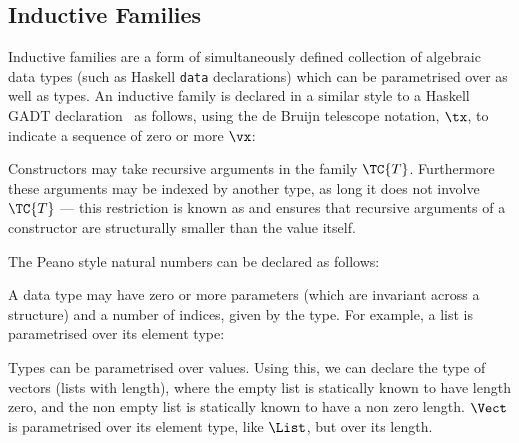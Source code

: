 \subsection{Inductive Families}

\label{indfamilies}

Inductive families \cite{dybjer94} are a form of simultaneously
defined collection of algebraic data types (such as Haskell
\texttt{data} declarations) which can be parametrised over
 as well as types.  An inductive family is declared 
in a similar style to a Haskell GADT declaration~\cite{gadts}
as
follows, using the de Bruijn telescope notation, $\tx$, to indicate a
sequence of zero or more $\vx$:


Constructors may take recursive arguments in the family
$\TC{T}$. Furthermore these arguments may be indexed by another type,
as long it does not involve $\TC{T}$ --- this restriction is known as
 and ensures that recursive arguments of a
constructor are structurally smaller than the value itself.

The Peano style natural numbers can be declared as follows:

\DM{
\Data\:\Nat\Hab\Type\hg\Where\hg\Z\Hab\Nat\:\mid\:\suc\Hab\fbind{\vk}{\Nat}{\Nat}
}

A data type may have zero or more parameters (which are invariant
across a structure) and a number of indices, given by the type. For
example, a list is parametrised over its element type:

\DM{
\AR{
\Data\:\List\:(\vA\Hab\Type)\Hab\Type\hg\Where
\ARd{
& \nil\Hab\List\:\vA\\
\mid & \cons\Hab\fbind{\vx}{\vA}{\fbind{\vxs}{\List\:\vA}{\List\:\vA}}
}
}
}

Types can be
parametrised over values. Using this, we can declare the type of
vectors (lists with length), where the empty list is statically known
to have length zero, and the non empty list is statically known to
have a non zero length. $\Vect$ is parametrised over its element type,
like $\List$, but  over its length.

\DM{
\AR{
\Data\:\Vect\:(\vA\Hab\Type)\Hab\Nat\to\Type\hg\Where \\
\hg\hg\ARd{
& \Vnil\Hab\Vect\:\vA\:\Z\\
\mid & \Vcons\Hab\fbind{\vk}{\Nat}{
\fbind{\vx}{\vA}{\fbind{\vxs}{\Vect\:\vA\:\vk}{\Vect\:\vA\:(\suc\:\vk)}}
}
}
}
}

